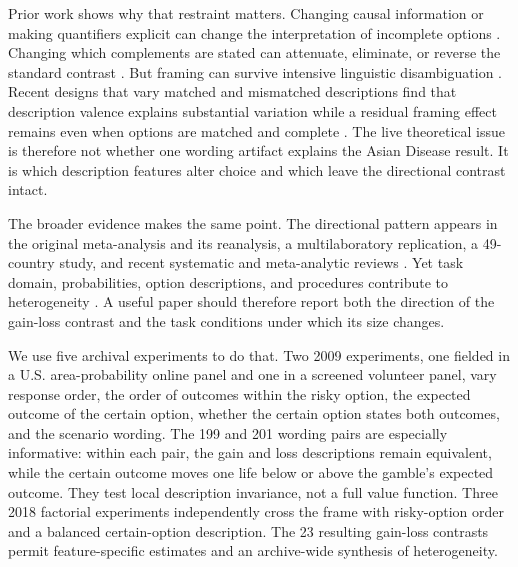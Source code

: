 \documentclass[11pt]{article}
\begin{document}
Prior work shows why that restraint matters. Changing causal information or making quantifiers explicit can change the interpretation of incomplete options \parencite{jou1996schemas,mandel2014irrational}. Changing which complements are stated can attenuate, eliminate, or reverse the standard contrast \parencite{kuhberger1995newlook,kuhberger2010task,zhou2021descriptions}. But framing can survive intensive linguistic disambiguation \parencite{chick2016ambiguity}. Recent designs that vary matched and mismatched descriptions find that description valence explains substantial variation while a residual framing effect remains even when options are matched and complete \parencite{dekay2024mismatched,dekay2026complete}. The live theoretical issue is therefore not whether one wording artifact explains the Asian Disease result. It is which description features alter choice and which leave the directional contrast intact.

The broader evidence makes the same point. The directional pattern appears in the original meta-analysis and its reanalysis, a multilaboratory replication, a 49-country study, and recent systematic and meta-analytic reviews \parencite{kuhberger1998meta,klein2014manylabs,steiger2018reappraisal,im2022crossnational,kuhberger2023systematic,ding2025meta}. Yet task domain, probabilities, option descriptions, and procedures contribute to heterogeneity \parencite{kuhberger1999reflection,diederich2018moderators,dekay2022metastudies}. A useful paper should therefore report both the direction of the gain-loss contrast and the task conditions under which its size changes.

We use five archival experiments to do that. Two 2009 experiments, one fielded in a U.S. area-probability online panel and one in a screened volunteer panel, vary response order, the order of outcomes within the risky option, the expected outcome of the certain option, whether the certain option states both outcomes, and the scenario wording. The 199 and 201 wording pairs are especially informative: within each pair, the gain and loss descriptions remain equivalent, while the certain outcome moves one life below or above the gamble's expected outcome. They test local description invariance, not a full value function. Three 2018 factorial experiments independently cross the frame with risky-option order and a balanced certain-option description. The 23 resulting gain-loss contrasts permit feature-specific estimates and an archive-wide synthesis of heterogeneity.
\end{document}
